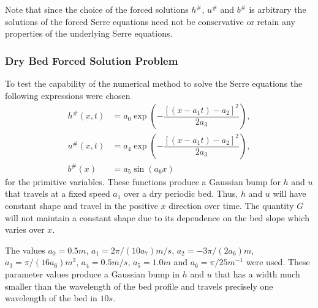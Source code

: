 \documentclass[times]{elsarticle}
\begin{document}
Note that since the choice of the forced solutions $h^\#$, $u^\#$ and $b^\#$ is arbitrary the solutions of the forced Serre equations need not be conservative or retain any properties of the underlying Serre equations.

\subsubsection{Dry Bed Forced Solution Problem}
To test the capability of the numerical method to solve the Serre equations the following expressions were chosen
\begin{subequations}
	\begin{align}
	\label{eqn:ForcedSolutionxt}
	h^\#(x,t) &=  a_0 \exp\left(-\dfrac{\left[\left(x - a_1 t\right) - a_2\right]^2}{2 a_3}\right), \\
	u^\#(x,t) &= a_4 \exp\left(-\dfrac{\left[\left(x - a_1 t\right) - a_2\right]^2}{2 a_3}\right), \\
	b^\#(x) &= a_5 \sin\left(a_6 x\right)
	\end{align}
\end{subequations}
for the primitive variables. These functions produce a Gaussian bump for $h$ and $u$ that travels at a fixed speed $a_1$ over a dry periodic bed. Thus, $h$ and $u$ will have constant shape and travel in the positive $x$ direction over time. The quantity $G$ will not maintain a constant shape due to its dependence on the bed slope which varies over $x$.

The values $a_0 = 0.5m$, $a_1 = 2 \pi / \left(10 a_7\right) m/s$, $a_2 =- 3\pi/ \left(2 a_6\right)m$, $a_3 = \pi / (16 a_6) m^2$, $a_4 = 0.5 m/s$, $a_5 = 1.0 m$ and $a_6 = \pi / 25 m^{-1}$ were used. These parameter values produce a Gaussian bump in $h$ and $u$ that has a width much smaller than the wavelength of the bed profile and travels precisely one wavelength of the bed in $10s$.
\end{document}
